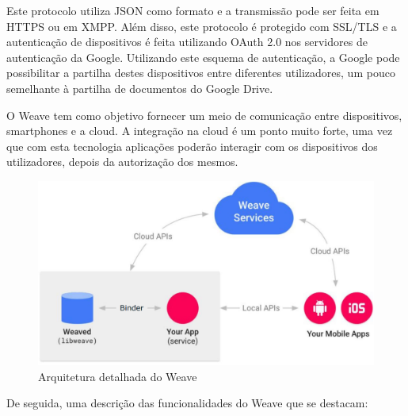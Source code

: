 Este protocolo utiliza JSON como formato e a transmissão pode ser feita em HTTPS ou em XMPP. Além disso, este protocolo é protegido com SSL/TLS e a autenticação de dispositivos é feita utilizando OAuth 2.0 nos servidores de autenticação da Google. Utilizando este esquema de autenticação, a Google pode possibilitar a partilha destes dispositivos entre diferentes utilizadores, um pouco semelhante à partilha de documentos do Google Drive.

O Weave tem como objetivo fornecer um meio de comunicação entre dispositivos, smartphones e a cloud. A integração na cloud é um ponto muito forte, uma vez que com esta tecnologia aplicações poderão interagir com os dispositivos dos utilizadores, depois da autorização dos mesmos.

\begin{figure}[H]
  \centering
        \includegraphics[width=\textwidth]{img/weave1.png}
  \caption{Arquitetura detalhada do Weave}
\end{figure}

De seguida, uma descrição das funcionalidades do Weave que se destacam:

